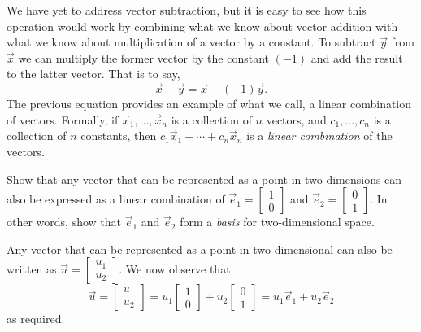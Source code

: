 \documentclass[../book.tex]{subfiles}
\begin{document}
We have yet to address vector subtraction, but it is easy to see how this operation would work by combining what we know about vector addition with what we know about multiplication of a vector by a constant. To subtract \(\vec{y}\) from \(\vec{x}\) we can multiply the former vector by the constant \((-1)\) and add the result to the latter vector. That is to say,
\begin{equation}\label{eq:vec-8}
\vec{x} - \vec{y}
=
\vec{x} + (-1) \vec{y}.
\end{equation}
The previous equation provides an example of what we call, a linear combination of vectors. Formally, if \(\vec{x}_1, \ldots, \vec{x}_n\) is a collection of \(n\) vectors, and \(c_1, \ldots, c_n\) is a collection of \(n\) constants, then \(c_1 \vec{x}_1 + \cdots + c_n  \vec{x}_n\) is a \emph{linear combination} of the vectors.

\begin{example} \label{eg:vector-decomposition}
Show that any vector that can be represented as a point in two dimensions can also be expressed as a linear combination of \(\vec{e}_1 = \begin{bmatrix}1\\ 0\end{bmatrix}\) and \(\vec{e}_2 =\begin{bmatrix}0\\ 1\end{bmatrix}\). In other words, show that \(\vec{e}_1\) and \(\vec{e}_2\) form a \emph{basis} for two-dimensional space.
\end{example}
\begin{solution}
Any vector that can be represented as a point in two-dimensional can also be written as \(\vec{u} = \begin{bmatrix} u_1 \\ u_2\end{bmatrix}\). We now observe that
\begin{equation}\label{eq:vec-9}
\vec{u} = 
\begin{bmatrix}
  u_1 \\ u_2 
\end{bmatrix}
= 
u_1 
\begin{bmatrix}
  1 \\ 0
\end{bmatrix}
+
u_2
\begin{bmatrix}
  0 \\ 1
\end{bmatrix}
=
u_1  \vec{e}_1
+
u_2  \vec{e}_2
\end{equation}
as required.
\end{solution}
\end{document}
